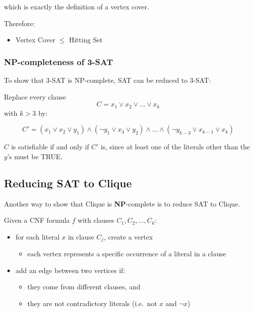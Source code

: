 \documentclass[11pt]{article}
\providecommand{\tightlist}{%
      \setlength{\itemsep}{0pt}\setlength{\parskip}{0pt}}
\begin{document}
which is exactly the definition of a vertex cover.

Therefore:

\begin{itemize}
\tightlist
\item
  Vertex Cover \(\leq\) Hitting Set
\end{itemize}

    \subsubsection{\texorpdfstring{\textbf{NP}-completeness of
3-SAT}{NP-completeness of 3-SAT}}\label{np-completeness-of-3-sat}

To show that 3-SAT is NP-complete, SAT can be reduced to 3-SAT:

Replace every clause \[ C = x_1 \lor x_2 \lor \ldots \lor x_k \] with
\(k > 3\) by:

\[ 
C' = (x_1 \lor x_2 \lor y_1) \land (\neg y_1 \lor x_3 \lor y_2) \land \ldots \land (\neg y_{k-3} \lor x_{k-1} \lor x_k) 
\]

\(C\) is satisfiable if and only if \(C'\) is, since at least one of the
literals other than the \(y\)'s must be TRUE.

    \subsection{Reducing SAT to Clique}\label{reducing-sat-to-clique}

Another way to show that Clique is \textbf{NP}-complete is to reduce SAT
to Clique.

Given a CNF formula \(f\) with clauses \(C_1, C_2, \ldots, C_k\):

\begin{itemize}
\tightlist
\item
  for each literal \(x\) in clause \(C_j\), create a vertex

  \begin{itemize}
  \tightlist
  \item
    each vertex represents a specific occurrence of a literal in a
    clause
  \end{itemize}
\item
  add an edge between two vertices if:

  \begin{itemize}
  \tightlist
  \item
    they come from different clauses, and
  \item
    they are not contradictory literals (i.e.~not \(x\) and \(\neg x\))
  \end{itemize}
\end{itemize}
\end{document}
